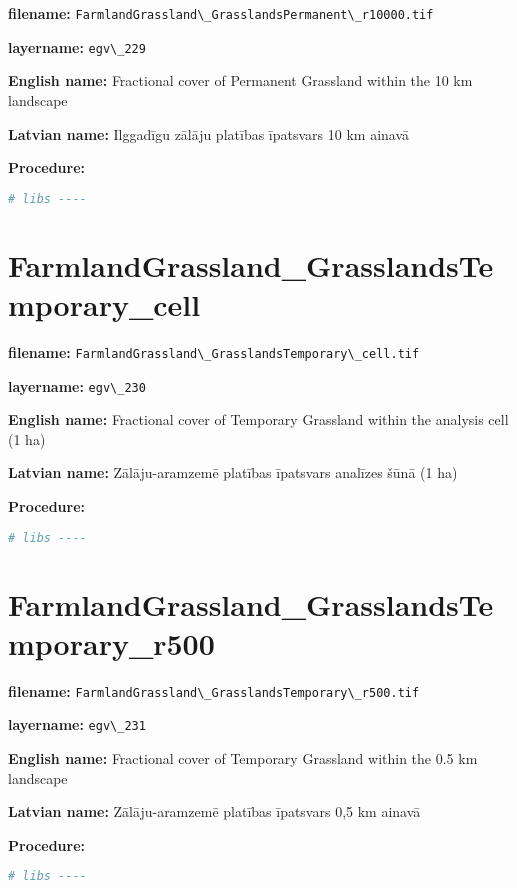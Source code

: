 \documentclass[
]{book}
\newcommand{\passthrough}[1]{#1}
\begin{document}
\textbf{filename:} \passthrough{\lstinline!FarmlandGrassland\_GrasslandsPermanent\_r10000.tif!}

\textbf{layername:} \passthrough{\lstinline!egv\_229!}

\textbf{English name:} Fractional cover of Permanent Grassland within the 10 km landscape

\textbf{Latvian name:} Ilggadīgu zālāju platības īpatsvars 10 km ainavā

\textbf{Procedure:}

\begin{lstlisting}[language=R]
# libs ----
\end{lstlisting}

\section{FarmlandGrassland\_GrasslandsTemporary\_cell}\label{ch06.230}

\textbf{filename:} \passthrough{\lstinline!FarmlandGrassland\_GrasslandsTemporary\_cell.tif!}

\textbf{layername:} \passthrough{\lstinline!egv\_230!}

\textbf{English name:} Fractional cover of Temporary Grassland within the analysis cell (1 ha)

\textbf{Latvian name:} Zālāju-aramzemē platības īpatsvars analīzes šūnā (1 ha)

\textbf{Procedure:}

\begin{lstlisting}[language=R]
# libs ----
\end{lstlisting}

\section{FarmlandGrassland\_GrasslandsTemporary\_r500}\label{ch06.231}

\textbf{filename:} \passthrough{\lstinline!FarmlandGrassland\_GrasslandsTemporary\_r500.tif!}

\textbf{layername:} \passthrough{\lstinline!egv\_231!}

\textbf{English name:} Fractional cover of Temporary Grassland within the 0.5 km landscape

\textbf{Latvian name:} Zālāju-aramzemē platības īpatsvars 0,5 km ainavā

\textbf{Procedure:}

\begin{lstlisting}[language=R]
# libs ----
\end{lstlisting}
\end{document}
